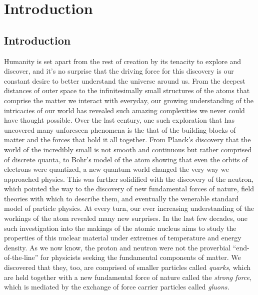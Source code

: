 \chapter{Introduction}


\section{Introduction}
Humanity is set apart from the rest of creation by its tenacity to explore and discover, and it's no surprise that the driving force for this discovery is our constant desire to better understand the universe around us. From the deepest distances of outer space to the infinitesimally small structures of the atoms that comprise the matter we interact with everyday, our growing understanding of the intricacies of our world has revealed such amazing complexities we never could have thought possible. Over the last century, one such exploration that has uncovered many unforeseen phenomena is the that of the building blocks of matter and the forces that hold it all together. From Planck's discovery that the world of the incredibly small is not smooth and continuous but rather comprised of discrete quanta, to Bohr's model of the atom showing that even the orbits of electrons were quantized, a new quantum world changed the very way we approached physics. This was further solidified with the discovery of the neutron, which pointed the way to the discovery of new fundamental forces of nature, field theories with which to describe them, and eventually the venerable standard model of particle physics. At every turn, our ever increasing understanding of the workings of the atom revealed many new surprises. In the last few decades, one such investigation into the makings of the atomic nucleus aims to study the properties of this nuclear material under extremes of temperature and energy density. As we now know, the proton and neutron were not the proverbial 
``end-of-the-line'' for physicists seeking the fundamental components of matter. We discovered that they, too, are comprised of smaller particles called \textit{quarks}, which are held together with a new fundamental force of nature called the \textit{strong force}, which is mediated by the exchange of force carrier particles called \textit{gluons.} 

